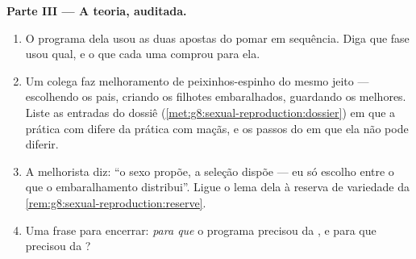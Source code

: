 \begin{problem}
\medskip\noindent\textbf{Parte III --- A teoria,
auditada.}
\begin{enumerate}[resume]
  \item O programa dela usou as duas apostas do pomar em sequência.
        Diga que fase usou qual, e o que cada uma comprou para ela.
  \item Um colega faz melhoramento de peixinhos-espinho do mesmo
        jeito --- escolhendo os pais, criando os filhotes
        embaralhados, guardando os melhores. Liste as entradas do
        dossiê (\cref{met:g8:sexual-reproduction:dossier}) em que a
        prática com  difere da prática com maçãs, e os passos
        do  em que ela não pode diferir.
  \item A melhorista diz: ``o sexo propõe, a seleção dispõe --- eu só
        escolho entre o que o embaralhamento distribui''. Ligue o
        lema dela à reserva de variedade da
        \cref{rem:g8:sexual-reproduction:reserve}.
  \item Uma frase para encerrar: \emph{para que} o programa precisou
        da , e para que precisou da ?
\end{enumerate}
\end{problem}
